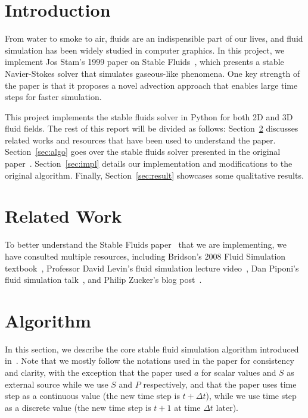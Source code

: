\documentclass[sigconf]{acmart}
\begin{document}
\maketitle

\section{Introduction}
From water to smoke to air, fluids are an indispensible part of our lives, and
fluid simulation has been widely studied in computer graphics. In this project,
we implement Jos Stam's 1999 paper on Stable Fluids~\cite{Stam1999Fluid}, which
presents a stable Navier-Stokes solver that simulates gaseous-like phenomena.
One key strength of the paper is that it proposes a novel advection approach
that enables large time steps for faster simulation.

This project implements the stable fluids solver in Python for both 2D and 3D fluid fields.
The rest of this report will be divided as follows: Section~\ref{sec:related}
discusses related works and resources that have been used to understand the paper.
Section~\ref{sec:algo} goes over the stable fluids solver presented in the original
paper~\cite{Stam1999Fluid}. Section~\ref{sec:impl} details our implementation and
modifications to the original algorithm. Finally, Section~\ref{sec:result} showcases
some qualitative results.

\section{Related Work}
\label{sec:related}
To better understand the Stable Fluids paper~\cite{Stam1999Fluid} that we are implementing, we have consulted multiple resources, including Bridson's 2008 Fluid Simulation textbook~\cite{Bridon2008FluidBook}, Professor David Levin's fluid simulation lecture video~\cite{csc417fluidvideo}, Dan Piponi's fluid simulation talk~\cite{piponitalk}, and Philip Zucker's blog post~\cite{zuckerblog}.

\section{Algorithm}
In this section, we describe the core stable fluid simulation algorithm introduced in~\cite{Stam1999Fluid}. Note that we mostly follow the notations used in the paper for consistency and clarity, with the exception that the paper used $a$ for scalar values and $S$ as external source while we use $S$ and $P$ respectively, and that the paper uses time step as a continuous value (the new time step is $t + \Delta t$), while we use time step as a discrete value (the new time step is $t + 1$ at time $\Delta t$ later).
\label{sec:algo}
\end{document}
